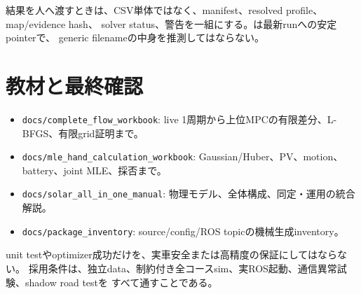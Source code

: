 \documentclass[
  japanese,
  a4paper,
]{article}
\providecommand{\tightlist}{%
  \setlength{\itemsep}{0pt}\setlength{\parskip}{0pt}}
\begin{document}
結果を人へ渡すときは、CSV単体ではなく、manifest、resolved
profile、map/evidence hash、 solver
status、警告を一組にする。は最新runへの安定pointerで、
generic filenameの中身を推測してはならない。

\section{教材と最終確認}\label{ux6559ux6750ux3068ux6700ux7d42ux78baux8a8d}

\begin{itemize}
\tightlist
\item
  \texttt{docs/complete\_flow\_workbook}: live
  1周期から上位MPCの有限差分、L-BFGS、有限grid証明まで。
\item
  \texttt{docs/mle\_hand\_calculation\_workbook}:
  Gaussian/Huber、PV、motion、battery、joint MLE、採否まで。
\item
  \texttt{docs/solar\_all\_in\_one\_manual}:
  物理モデル、全体構成、同定・運用の統合解説。
\item
  \texttt{docs/package\_inventory}: source/config/ROS
  topicの機械生成inventory。
\end{itemize}

unit
testやoptimizer成功だけを、実車安全または高精度の保証にしてはならない。
採用条件は、独立data、制約付き全コースsim、実ROS起動、通信異常試験、shadow
road testを すべて通すことである。
\end{document}
